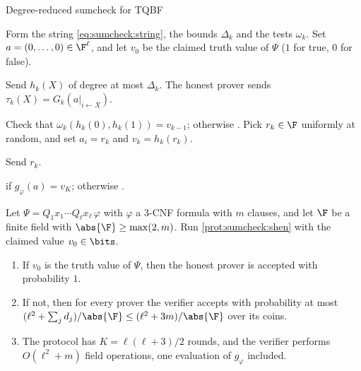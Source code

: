 \begin{refsection}
\begin{protocol}{Degree-reduced sumcheck for TQBF}\label{prot:sumcheck:shen}
\item[\act{V}] Form the string \eqref{eq:sumcheck:string}, the bounds $\Delta_k$ and the tests $\omega_k$. Set $a=(0,\dots,0)\in\F^\ell$, and let $v_0$ be the claimed truth value of $\Psi$ ($1$ for true, $0$ for false).
\item[\msg{P}{V}] Send $h_k(X)$ of degree at most $\Delta_k$. The honest prover sends $\tau_k(X)=G_k(a|_{i\gets X})$.
\item[\act{V}] Check that $\omega_k(h_k(0),h_k(1))=v_{k-1}$; otherwise \rej. Pick $r_k\in\F$ uniformly at random, and set $a_i=r_k$ and $v_k=h_k(r_k)$.
\item[\msg{V}{P}] Send $r_k$.
\item[\act{V}] \acc{} if $g_\varphi(a)=v_K$; otherwise \rej.
\end{protocol}

\begin{theorem}\label{thm:sumcheck:shen}
Let $\Psi=Q_1x_1\cdots Q_\ell x_\ell\,\varphi$ with $\varphi$ a 3-CNF formula with $m$ clauses, and let $\F$ be a finite field with $\abs{\F}\ge\max(2,m)$. Run \cref{prot:sumcheck:shen} with the claimed value $v_0\in\bits$.
\begin{enumerate}
\item If $v_0$ is the truth value of $\Psi$, then the honest prover is accepted with probability $1$.
\item If not, then for every prover the verifier accepts with probability at most $(\ell^2+\sum_jd_j)/\abs{\F}\le(\ell^2+3m)/\abs{\F}$ over its coins.
\item The protocol has $K=\ell(\ell+3)/2$ rounds, and the verifier performs $O(\ell^2+m)$ field operations, one evaluation of $g_\varphi$ included.
\end{enumerate}
\end{theorem}


\end{refsection}
